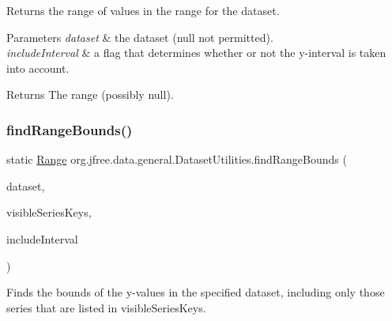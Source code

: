 Returns the range of values in the range for the dataset.


\begin{DoxyParams}{Parameters}
{\em dataset} & the dataset ({\ttfamily null} not permitted). \\
\hline
{\em include\+Interval} & a flag that determines whether or not the y-\/interval is taken into account.\\
\hline
\end{DoxyParams}
\begin{DoxyReturn}{Returns}
The range (possibly {\ttfamily null}). 
\end{DoxyReturn}
\mbox{\label{classorg_1_1jfree_1_1data_1_1general_1_1_dataset_utilities_a593802b49fe6d916e951136610d0a8c1}} 
\subsubsection{\texorpdfstring{find\+Range\+Bounds()}{findRangeBounds()}\hspace{0.1cm}{\footnotesize\ttfamily [3/6]}}
{\footnotesize\ttfamily static \mbox{\hyperlink{classorg_1_1jfree_1_1data_1_1_range}{Range}} org.\+jfree.\+data.\+general.\+Dataset\+Utilities.\+find\+Range\+Bounds (\begin{DoxyParamCaption}\item[{\mbox{\hyperlink{interfaceorg_1_1jfree_1_1data_1_1category_1_1_category_dataset}{Category\+Dataset}}}]{dataset,  }\item[{List}]{visible\+Series\+Keys,  }\item[{boolean}]{include\+Interval }\end{DoxyParamCaption})\hspace{0.3cm}{\ttfamily [static]}}

Finds the bounds of the y-\/values in the specified dataset, including only those series that are listed in visible\+Series\+Keys.



